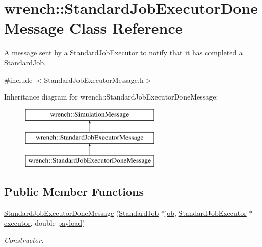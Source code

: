 \hypertarget{classwrench_1_1_standard_job_executor_done_message}{}\section{wrench\+:\+:Standard\+Job\+Executor\+Done\+Message Class Reference}
\label{classwrench_1_1_standard_job_executor_done_message}


A message sent by a \hyperlink{classwrench_1_1_standard_job_executor}{Standard\+Job\+Executor} to notify that it has completed a \hyperlink{classwrench_1_1_standard_job}{Standard\+Job}.  




{\ttfamily \#include $<$Standard\+Job\+Executor\+Message.\+h$>$}

Inheritance diagram for wrench\+:\+:Standard\+Job\+Executor\+Done\+Message\+:\begin{figure}[H]
\begin{center}
\leavevmode
\includegraphics[height=3.000000cm]{classwrench_1_1_standard_job_executor_done_message}
\end{center}
\end{figure}
\subsection*{Public Member Functions}
\begin{DoxyCompactItemize}
\item 
\hyperlink{classwrench_1_1_standard_job_executor_done_message_afdd5b2d090ce6f066ffd5fcda8609955}{Standard\+Job\+Executor\+Done\+Message} (\hyperlink{classwrench_1_1_standard_job}{Standard\+Job} $\ast$\hyperlink{classwrench_1_1_standard_job_executor_done_message_a16beda555e2878276fd7df649834867d}{job}, \hyperlink{classwrench_1_1_standard_job_executor}{Standard\+Job\+Executor} $\ast$\hyperlink{classwrench_1_1_standard_job_executor_done_message_ae655453e7f62d556a3ffd9ae0e60e87d}{executor}, double \hyperlink{classwrench_1_1_simulation_message_a914f2732713f7c02898e66f05a7cb8a1}{payload})
\begin{DoxyCompactList}\small\item\em Constructor. \end{DoxyCompactList}\end{DoxyCompactItemize}
